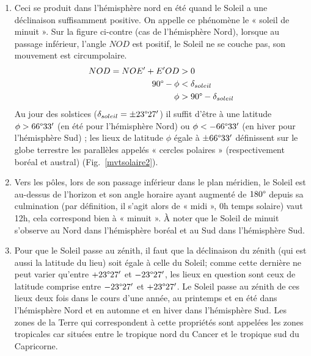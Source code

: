 \documentclass[a4paper,10pt]{report}
\renewcommand{\deg}{\ensuremath{\degree}}
\begin{document}
\begin{Answer}
\begin{enumerate}
  \item Ceci se produit dans l'hémisphère nord en été quand le Soleil
    a une déclinaison suffisamment positive. On appelle ce phénomène
    le « soleil de minuit ». Sur la figure ci-contre (cas de
    l'hémisphère Nord), lorsque au passage inférieur, l'angle $NOD$
    est positif, le Soleil ne se couche pas, son mouvement est
    circumpolaire.
    \begin{align*}
      NOD = NOE' + E'OD &> 0 \\
      90\deg - \phi &< \delta_{soleil} \\
      \phi &> 90\deg - \delta_{soleil}
    \end{align*}
    Au jour des solstices ($\delta_{soleil} = \pm 23\deg27'$) il
    suffit d'être à une latitude $\phi > 66\deg33'$ (en été pour
    l'hémisphère Nord) ou $\phi < - 66\deg33'$ (en hiver pour
    l'hémisphère Sud) ; les lieux de latitude $\phi$ égale à $\pm
    66\deg33'$ définissent sur le globe terrestre les parallèles
    appelés « cercles polaires » (respectivement boréal et austral)
    (Fig.~\ref{mvtsolaire2}).

  \item Vers les pôles, lors de son passage inférieur dans le plan
    méridien, le Soleil est au-dessus de l'horizon et son angle
    horaire ayant augmenté de $180\deg$ depuis sa culmination (par
    définition, il s'agit alors de « midi », 0h temps solaire) vaut
    12h, cela correspond bien à « minuit ». À noter que le Soleil de
    minuit s'observe au Nord dans l'hémisphère boréal et au Sud dans
    l'hémisphère Sud.

  \item Pour que le Soleil passe au zénith, il faut que la déclinaison
    du zénith (qui est aussi la latitude du lieu) soit égale à celle
    du Soleil; comme cette dernière ne peut varier qu'entre
    $+23\deg27'$ et $-23\deg27'$, les lieux en question sont ceux
    de latitude comprise entre $-23\deg27'$ et $+23\deg27'$. Le
    Soleil passe au zénith de ces lieux deux fois dans le cours d'une
    année, au printemps et en été dans l'hémisphère Nord et en automne
    et en hiver dans l'hémisphère Sud. Les zones de la Terre qui
    correspondent à cette propriétés sont appelées les zones
    tropicales car situées entre le tropique nord du Cancer et le
    tropique sud du Capricorne.


\end{enumerate}
\end{Answer}
\end{document}
